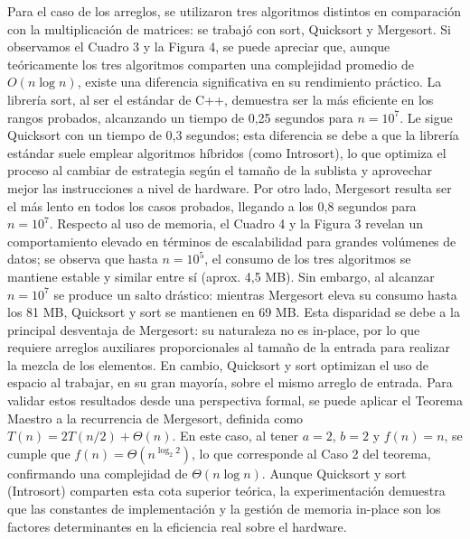 Para el caso de los arreglos, se utilizaron tres algoritmos distintos en comparación con la multiplicación de matrices: se trabajó con sort, Quicksort y Mergesort. Si observamos el Cuadro 3 y la Figura 4, se puede apreciar que, aunque teóricamente los tres algoritmos comparten una complejidad promedio de $O(n \log n)$, existe una diferencia significativa en su rendimiento práctico. La librería sort, al ser el estándar de C++, demuestra ser la más eficiente en los rangos probados, alcanzando un tiempo de 0,25 segundos para $n = 10^7$. Le sigue Quicksort con un tiempo de 0,3 segundos; esta diferencia se debe a que la librería estándar suele emplear algoritmos híbridos (como Introsort), lo que optimiza el proceso al cambiar de estrategia según el tamaño de la sublista y aprovechar mejor las instrucciones a nivel de hardware. Por otro lado, Mergesort resulta ser el más lento en todos los casos probados, llegando a los 0,8 segundos para $n = 10^7$. Respecto al uso de memoria, el Cuadro 4 y la Figura 3 revelan un comportamiento elevado en términos de escalabilidad para grandes volúmenes de datos; se observa que hasta $n = 10^5$, el consumo de los tres algoritmos se mantiene estable y similar entre sí (aprox. 4,5 MB). Sin embargo, al alcanzar $n = 10^7$ se produce un salto drástico: mientras Mergesort eleva su consumo hasta los 81 MB, Quicksort y sort se mantienen en 69 MB. Esta disparidad se debe a la principal desventaja de Mergesort: su naturaleza no es in-place, por lo que requiere arreglos auxiliares proporcionales al tamaño de la entrada para realizar la mezcla de los elementos. En cambio, Quicksort y sort optimizan el uso de espacio al trabajar, en su gran mayoría, sobre el mismo arreglo de entrada.
Para validar estos resultados desde una perspectiva formal, se puede aplicar el Teorema Maestro a la recurrencia de Mergesort, definida como $T(n) = 2T(n/2) + \Theta(n)$. En este caso, al tener $a=2$, $b=2$ y $f(n)=n$, se cumple que $f(n) = \Theta(n^{\log_2 2})$, lo que corresponde al Caso 2 del teorema, confirmando una complejidad de $\Theta(n \log n)$. Aunque Quicksort y sort (Introsort) comparten esta cota superior teórica, la experimentación demuestra que las constantes de implementación y la gestión de memoria in-place son los factores determinantes en la eficiencia real sobre el hardware.
